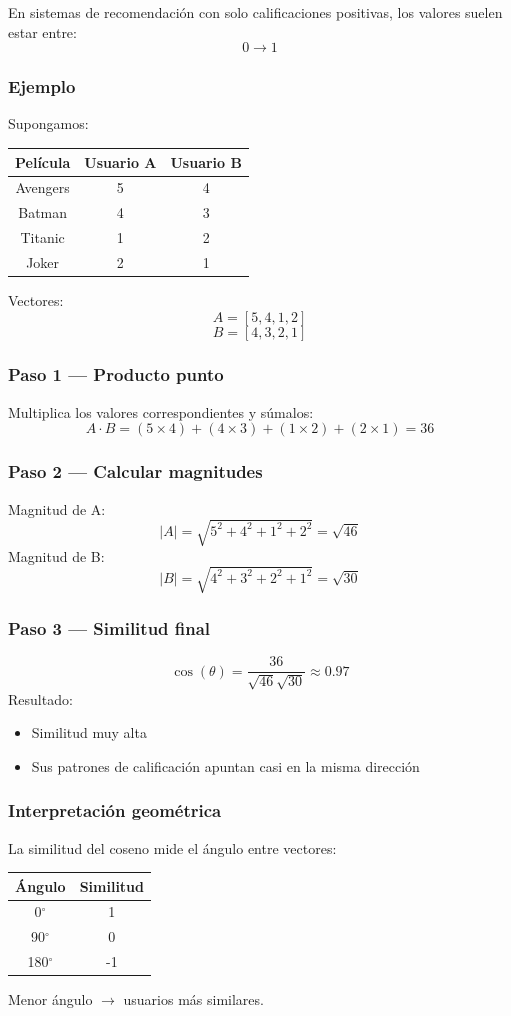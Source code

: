 \documentclass[12pt]{article}
\begin{document}
En sistemas de recomendación con solo calificaciones positivas, los valores suelen estar entre:
\[
0 \rightarrow 1
\]

\subsubsection*{Ejemplo}
Supongamos:
\begin{center}
\begin{tabular}{|c|c|c|}
\hline
Película & Usuario A & Usuario B \\
\hline
Avengers & 5 & 4 \\
Batman & 4 & 3 \\
Titanic & 1 & 2 \\
Joker & 2 & 1 \\
\hline
\end{tabular}
\end{center}

Vectores:
\[
A=[5,4,1,2]
\]
\[
B=[4,3,2,1]
\]

\subsubsection*{Paso 1 --- Producto punto}
Multiplica los valores correspondientes y súmalos:
\[
A\cdot B=(5\times4)+(4\times3)+(1\times2)+(2\times1)=36
\]

\subsubsection*{Paso 2 --- Calcular magnitudes}
Magnitud de A:
\[
|A|=\sqrt{5^2+4^2+1^2+2^2}=\sqrt{46}
\]
Magnitud de B:
\[
|B|=\sqrt{4^2+3^2+2^2+1^2}=\sqrt{30}
\]

\subsubsection*{Paso 3 --- Similitud final}
\[
\cos(\theta)=\frac{36}{\sqrt{46}\sqrt{30}}\approx0.97
\]
Resultado:
\begin{itemize}
\item Similitud muy alta
\item Sus patrones de calificación apuntan casi en la misma dirección
\end{itemize}

\subsubsection*{Interpretación geométrica}
La similitud del coseno mide el ángulo entre vectores:
\begin{center}
\begin{tabular}{|c|c|}
\hline
Ángulo & Similitud \\
\hline
0$^{\circ}$ & 1 \\
90$^{\circ}$ & 0 \\
180$^{\circ}$ & -1 \\
\hline
\end{tabular}
\end{center}
Menor ángulo $\rightarrow$ usuarios más similares.
\end{document}
